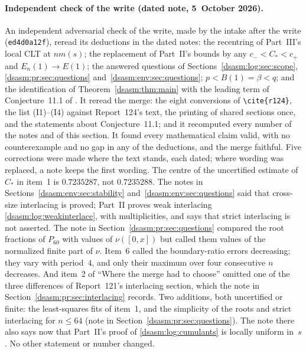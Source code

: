 \documentclass[11pt,letterpaper]{article}
\theoremstyle{remark}\newtheorem{remark}[theorem]{Remark}
\begin{document}
\paragraph{Independent check of the write (dated note, 5~October 2026).}
An independent adversarial check of the write, made by the intake after the write (\texttt{ed4d0a12f}), reread its deductions in the dated notes: the recentring of Part~III's local CLT at $nm(s)$; the replacement of Part~II's bounds by any $c_-<C_*<c_+$ and $E_n(1)\to E(1)$; the answered questions of Sections~\ref{dsasm:log:sec:scope}, \ref{dsasm:pr:sec:questions} and~\ref{dsasm:env:sec:questions}; $p<B(1)=\beta<q$; and the identification of Theorem~\ref{dsasm:thm:main} with the leading term of Conjecture~11.1 of \cite{bfk}. It reread the merge: the eight conversions of \verb|\cite{r124}|, the list (I1)--(I4) against Report~124's text, the printing of shared sections once, and the statements about Conjecture~11.1; and it recomputed every number of the notes and of this section. It found every mathematical claim valid, with no counterexample and no gap in any of the deductions, and the merge faithful. Five corrections were made where the text stands, each dated; where wording was replaced, a note keeps the first wording. The centre of the uncertified estimate of $C_*$ in item~1 is $0.7235287$, not $0.7235288$. The notes in Sections~\ref{dsasm:env:sec:stability} and~\ref{dsasm:env:sec:questions} said that cross-size interlacing is proved; Part~II proves weak interlacing \eqref{dsasm:log:weakinterlace}, with multiplicities, and says that strict interlacing is not asserted. The note in Section~\ref{dsasm:pr:sec:questions} compared the root fractions of $P_{60}$ with values of $\nu([0,x])$ but called them values of the normalized finite part of $\nu$. Item~6 called the boundary-ratio errors decreasing; they vary with period~$4$, and only their maximum over four consecutive $n$ decreases. And item~2 of ``Where the merge had to choose'' omitted one of the three differences of Report~121's interlacing section, which the note in Section~\ref{dsasm:pr:sec:interlacing} records. Two additions, both uncertified or finite: the least-squares fits of item~1, and the simplicity of the roots and strict interlacing for $n\le64$ (note in Section~\ref{dsasm:pr:sec:questions}). The note there also says now that Part~II's proof of \eqref{dsasm:log:cumulants} is locally uniform in~$s$. No other statement or number changed.
\end{document}
